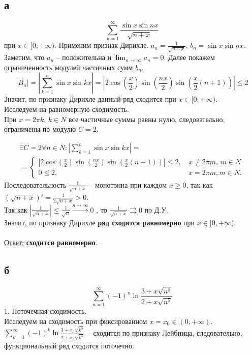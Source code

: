 \documentclass[a5paper, 10pt]{article}
\theoremstyle{definition}
\theoremstyle{plain}
\theoremstyle{remark}
\begin{document}
\subsection{а}
\begin{equation*}
\sum  \limits_{n = 1}^{\infty} \frac{\sin x \sin nx}{\sqrt{n + x}}
\end{equation*}
при $ x \in [0, + \infty)$.
Применим признак Дирихле. $a_n = \frac{1}{\sqrt{n + x}}, \, b_n = \sin x \sin nx$. Заметим, что $a_n$ -- положительна и $\lim_{n \to \infty} a_n = 0$. Далее покажем ограниченность модулей частичных сумм $ b_n$.
\begin{equation*}
\left| B_n \right| = \left| \sum  \limits_{k = 1}^{n}  \sin x \sin kx \right| = \left|  2 \cos \left(\frac{x}{2}\right) \sin \left(\frac{nx}{2}\right) \sin \left(\frac{x}{2}(n+1)\right) \right| \leq 2
\end{equation*}
Значит, по признаку Дирихле данный ряд сходится при $ x \in [0, + \infty)$.\\
Исследуем на равномерную сходимость. \\
При $x = 2 \pi k, \, k \in N$ все частичные суммы равны нулю, следовательно, ограничены по модулю $C=2$.

\begin{multline*}
\exists C= 2 \forall n \in N :  \left| \sum  \limits_{k = 1}^{n}  \sin x \sin kx \right| = \\ =
\begin{cases}
   \left|  2 \cos \left(\frac{x}{2}\right) \sin \left(\frac{nx}{2}\right) \sin \left(\frac{x}{2}(n+1)\right) \right| \leq 2,  & \, x \neq 2\pi m, \, m \in N \\
   0 \leq 2, &\, x = 2\pi m, m \in N.
 \end{cases}
\end{multline*}
Последовательность $\frac{1}{\sqrt{n + x}}$ -- монотонна при каждом $x \geq 0$, так как $\left(\sqrt{n + x} \right)' = \frac{1}{2\sqrt{n + x}} > 0$.\\
Так как $\left|\frac{1}{\sqrt{n + x}} \right| \leq \frac{1}{\sqrt{n}} \xrightarrow{n \to \infty} 0$ , то $\frac{1}{\sqrt{n + x}} \rightrightarrows 0$ по Д.У.\\
Значит, по признаку Дирихле \textbf{ряд сходится равномерно} при  $ x \in [0, + \infty)$.\\\\
\underline{Ответ:}   \textbf{сходится равномерно}.

\newpage
\subsection{б}
\begin{equation*}
\sum  \limits_{n = 1}^{\infty}(-1)^n \ln \frac{3+x\sqrt{n^5}}{2+x\sqrt{n^5}}
\end{equation*}
1. Поточечная сходимость.\\
Исследуем на сходимость при фиксированном $x = x_0 \in (0, + \infty)$. $\sum  \limits_{k = 1}^{\infty} (-1)^k \ln \frac{3+x_0 \sqrt{k^5}}{2+x_0 \sqrt{k^5}}$ -- сходится по признаку Лейбница, следовательно, функциональный ряд сходится поточечно.\\
\end{document}
